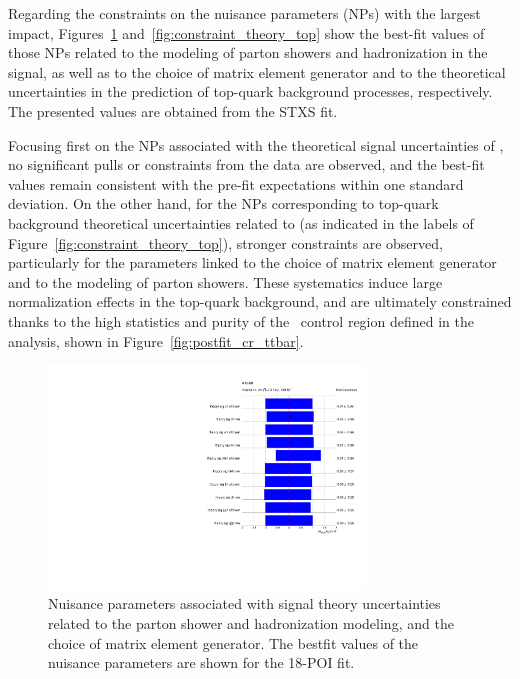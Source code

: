 Regarding the constraints on the nuisance parameters (NPs) with the largest impact, 
Figures~\ref{fig:constraint_theory_sig} and~\ref{fig:constraint_theory_top} show the best-fit values of those NPs related to the modeling of parton showers and hadronization in the signal, 
as well as to the choice of matrix element generator and to the theoretical uncertainties in the prediction of top-quark background processes, respectively. 
The presented values are obtained from the STXS fit. 

Focusing first on the NPs associated with the theoretical signal uncertainties of \ttH, no significant pulls or constraints from the data are observed, 
and the best-fit values remain consistent with the pre-fit expectations within one standard deviation. 
On the other hand, for the NPs corresponding to top-quark background theoretical uncertainties related to \ttH (as indicated in the labels of Figure~\ref{fig:constraint_theory_top}), 
stronger constraints are observed, particularly for the parameters linked to the choice of matrix element generator and to the modeling of parton showers. 
These systematics induce large normalization effects in the top-quark background, and are ultimately constrained thanks to the high statistics and purity of the \ttbar\ control region defined in the analysis, shown in Figure~\ref{fig:postfit_cr_ttbar}.

\begin{figure}[htbp]
  \centering
  \includegraphics[width=0.75\textwidth]{images/fit_stxs/STXS_combine_all_xs_NP_theory_sig.pdf}
  \caption{Nuisance parameters associated with signal theory uncertainties
  related to the parton shower and hadronization modeling, and the choice of matrix
  element generator. The bestfit values of the nuisance parameters are shown for the 18-POI fit.}
  \label{fig:constraint_theory_sig}
\end{figure}

